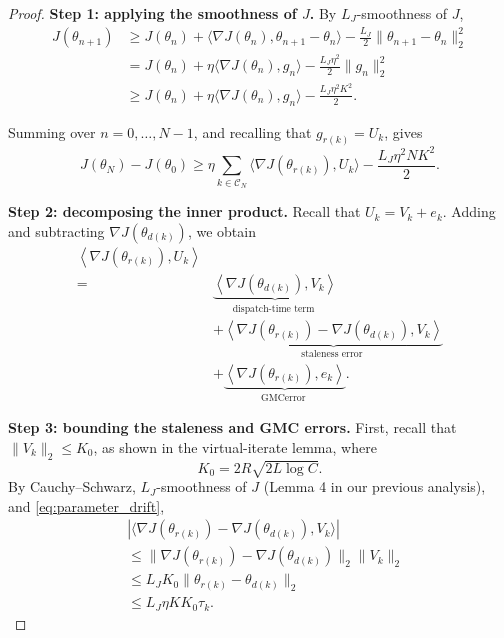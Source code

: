 \begin{proof}
\textbf{Step 1: applying the smoothness of $J$.}
By $L_J$-smoothness of $J$,
\begin{align*}
J(\theta_{n+1})
&\ge J(\theta_n)
+\langle\nabla J(\theta_n),
\theta_{n+1}-\theta_n\rangle
-\frac{L_J}{2}\|\theta_{n+1}-\theta_n\|_2^2\\
&=J(\theta_n)
+\eta\langle\nabla J(\theta_n),g_n\rangle
-\frac{L_J\eta^2}{2}\|g_n\|_2^2\\
&\ge J(\theta_n)
+\eta\langle\nabla J(\theta_n),g_n\rangle
-\frac{L_J\eta^2K^2}{2}.
\end{align*}

Summing over $n=0,\ldots,N-1$, and recalling that
$g_{r(k)}=U_k$, gives
\begin{equation}
J(\theta_N)-J(\theta_0)
\ge
\eta\sum_{k\in\mathcal C_N}
\langle\nabla J(\theta_{r(k)}),U_k\rangle
-\frac{L_J\eta^2NK^2}{2}.
\label{eq:async_descent}
\end{equation}

\textbf{Step 2: decomposing the inner product.}
Recall that $U_k=V_k+e_k$. Adding and subtracting
$\nabla J(\theta_{d(k)})$, we obtain
\begin{align*}
\left\langle\nabla J\left(\theta_{r(k)}\right), U_k\right\rangle & \\
= & \underbrace{\left\langle\nabla J\left(\theta_{d(k)}\right), V_k\right\rangle}_{\text {dispatch-time term }} \\
& +\underbrace{\left\langle\nabla J\left(\theta_{r(k)}\right)-\nabla J\left(\theta_{d(k)}\right), V_k\right\rangle}_{\text {staleness error }} \\
& +\underbrace{\left\langle\nabla J\left(\theta_{r(k)}\right), e_k\right\rangle}_{\text {GMCerror }} .
\end{align*}


\textbf{Step 3: bounding the staleness and GMC errors.}
First, recall that $\|V_k\|_2\le K_0$, as shown
in the virtual-iterate lemma, where
\[
K_0=2R\sqrt{2L\log C}.
\]
By Cauchy--Schwarz, $L_J$-smoothness of $J$
(Lemma 4 in our previous analysis), and
\eqref{eq:parameter_drift},
\begin{align*}
&|\langle
\nabla J(\theta_{r(k)})-\nabla J(\theta_{d(k)}),
V_k\rangle|\\
&\le
\|\nabla J(\theta_{r(k)})
-\nabla J(\theta_{d(k)})\|_2\|V_k\|_2\\
&\le L_JK_0
\|\theta_{r(k)}-\theta_{d(k)}\|_2\\
&\le L_J\eta KK_0\tau_k.
\end{align*}



\end{proof}
